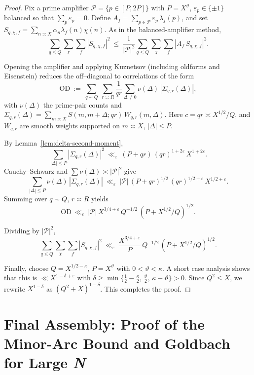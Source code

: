 \documentclass[11pt]{article}
\theoremstyle{definition}
\theoremstyle{remark}
\numberwithin{equation}{part}
\begin{document}
\begin{proof}
	Fix a prime amplifier $\mathcal P=\{p\in[P,2P]\}$ with $P=X^\vartheta$, $\varepsilon_p\in\{\pm1\}$ balanced so that $\sum_p\varepsilon_p=0$.
	Define $A_f=\sum_{p\in\mathcal P}\varepsilon_p\,\lambda_f(p)$, and set
	$S_{q,\chi,f}=\sum_{n\asymp X}\alpha_n\lambda_f(n)\chi(n)$.
	As in the balanced-amplifier method,
	\[
		\sum_{q\le Q}\sum_{\chi}\sum_f |S_{q,\chi,f}|^2
		\ \le\ \frac{1}{|\mathcal P|^2}\sum_{q\le Q}\sum_{\chi}\sum_f |A_f\,S_{q,\chi,f}|^2.
	\]

	Opening the amplifier and applying Kuznetsov (including oldforms and Eisenstein) reduces the off--diagonal to correlations of the form
	\[
		\mathrm{OD}\ :=\ \sum_{q\sim Q}\ \sum_{r\asymp R}\frac{1}{qr}\sum_{\Delta\ne0}\nu(\Delta)\,|\Sigma_{q,r}(\Delta)|,
	\]
	with $\nu(\Delta)$ the prime-pair counts and
	$\Sigma_{q,r}(\Delta)=\sum_{m\asymp X} S(m,m+\Delta;qr)\,W_{q,r}(m,\Delta)$.
	Here $c=qr\asymp X^{1/2}/Q$, and $W_{q,r}$ are smooth weights supported on $m\asymp X$, $|\Delta|\le P$.

	By Lemma~\ref{lem:delta-second-moment},
	\[
		\sum_{|\Delta|\le P}|\Sigma_{q,r}(\Delta)|^2
		\ \ll_\varepsilon\ (P+qr)\,(qr)^{1+2\varepsilon}\,X^{1+2\varepsilon}.
	\]
	Cauchy--Schwarz and $\sum\nu(\Delta)\asymp |\mathcal P|^2$ give
	\[
		\sum_{|\Delta|\le P}\nu(\Delta)\,|\Sigma_{q,r}(\Delta)|
		\ \ll_\varepsilon\
		|\mathcal P|\,(P+qr)^{1/2}\,(qr)^{1/2+\varepsilon}\,X^{1/2+\varepsilon}.
	\]
	Summing over $q\sim Q$, $r\asymp R$ yields
	\[
		\mathrm{OD}\ \ll_\varepsilon\
		|\mathcal P|\,X^{3/4+\varepsilon}\,Q^{-1/2}\,(P+X^{1/2}/Q)^{1/2}.
	\]

	Dividing by $|\mathcal P|^2$,
	\[
		\sum_{q\le Q}\sum_{\chi}\sum_f |S_{q,\chi,f}|^2
		\ \ll_\varepsilon\ \frac{X^{3/4+\varepsilon}}{P}\,Q^{-1/2}\,(P+X^{1/2}/Q)^{1/2}.
	\]

	Finally, choose $Q=X^{1/2-\kappa}$, $P=X^\vartheta$ with $0<\vartheta<\kappa$.
	A short case analysis shows that this is $\ll X^{1-\delta+\varepsilon}$ with $\delta\ge\min\{\tfrac12-\tfrac{\kappa}{2},\,\tfrac{\vartheta}{2},\,\kappa-\vartheta\}>0$.
	Since $Q^2\le X$, we rewrite $X^{1-\delta}$ as $(Q^2+X)^{1-\delta}$.
	This completes the proof.
\end{proof}

\part{Final Assembly: Proof of the Minor-Arc Bound and Goldbach for Large \textit{N}}
\end{document}
